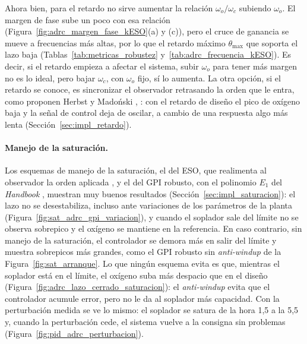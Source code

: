 Ahora bien, para el retardo no sirve aumentar la relación $\omega_o/\omega_c$ subiendo $\omega_o$. El
margen de fase sube un poco con esa relación (Figura~\ref{fig:adrc_margen_fase_kESO}(a) y (c)), pero
el cruce de ganancia se mueve a frecuencias más altas, por lo que el retardo máximo $\theta_{\max}$ que soporta el lazo
baja (Tablas~\ref{tab:metricas_robustez} y~\ref{tab:adrc_frecuencia_kESO}). Es decir, si el retardo empieza a
afectar el sistema, subir $\omega_o$ para tener más margen no es lo ideal, pero bajar $\omega_c$, con
$\omega_o$ fijo, sí lo aumenta. La otra opción, si el retardo se conoce, es sincronizar el observador
retrasando la orden que le entra, como proponen Herbst y Madoński \cite[sec.~9.4]{herbst2024adrc},
\cite{herbst2013practical}: con el retardo de diseño el pico de oxígeno baja y la señal de control deja
de oscilar, a cambio de una respuesta algo más lenta (Sección~\ref{sec:impl_retardo}).

\paragraph{Manejo de la saturación.} Los esquemas de manejo de la saturación, el del ESO, que
realimenta al observador la orden aplicada \cite[sec.~9.1.1]{herbst2024adrc}, y el del GPI robusto, con el
polinomio $E_1$ del \emph{Handbook} \cite[sec.~19.1.3]{levine2011handbook}, muestran muy buenos
resultados (Sección~\ref{sec:impl_saturacion}): el lazo no se desestabiliza, incluso ante variaciones
de los parámetros de la planta (Figura~\ref{fig:sat_adrc_gpi_variacion}), y cuando el soplador sale del
límite no se observa sobrepico y el oxígeno se mantiene en la referencia. En caso contrario, sin manejo
de la saturación, el controlador se demora más en salir del límite y muestra sobrepicos más grandes,
como el GPI robusto sin \emph{anti-windup} de la Figura~\ref{fig:sat_arranque}. Lo que ningún esquema evita es
que, mientras el soplador está en el límite, el oxígeno suba más despacio que en el diseño
(Figura~\ref{fig:adrc_lazo_cerrado_saturacion}): el \emph{anti-windup} evita que el controlador acumule
error, pero no le da al soplador más capacidad. Con la perturbación medida se ve lo mismo: el
soplador se satura de la hora 1,5 a la 5,5 y, cuando la perturbación cede, el sistema vuelve a la
consigna sin problemas (Figura~\ref{fig:pid_adrc_perturbacion}).

